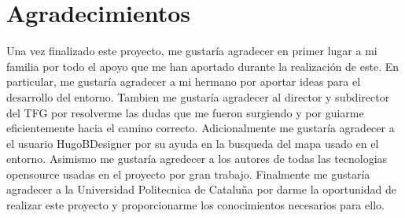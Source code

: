 \section{Agradecimientos}

Una vez finalizado este proyecto, me gustaría agradecer en primer lugar a mi familia por todo el apoyo que me han aportado durante la realización de este. En particular, me gustaría agradecer a mi hermano por aportar ideas para el desarrollo del entorno. Tambien me gustaría agradecer al director y subdirector del TFG por resolverme las dudas que me fueron surgiendo y por guiarme eficientemente hacia el camino correcto. Adicionalmente me gustaría agradecer a el usuario HugoBDesigner por su ayuda en la busqueda del mapa usado en el entorno. Asimismo me gustaría agredecer a los autores de todas las tecnologias opensource usadas en el proyecto por gran trabajo. Finalmente me gustaría agradecer a la Universidad Politecnica de Cataluña por darme la oportunidad de realizar este proyecto y proporcionarme los conocimientos necesarios para ello.

